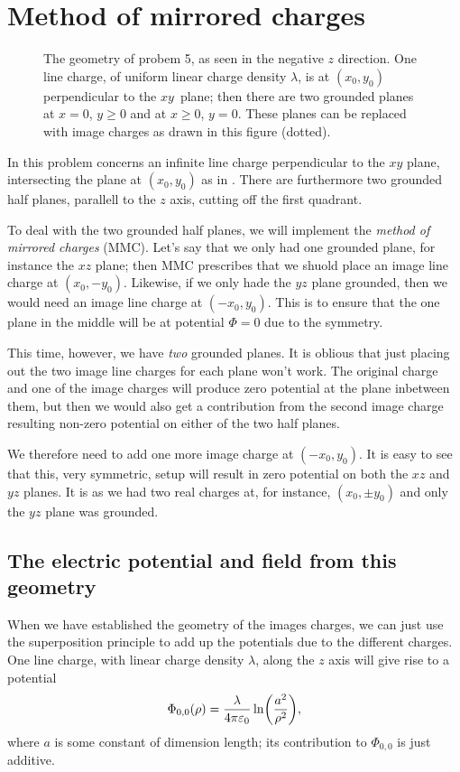 \documentclass[11pt,letter, swedish, english
]{article}
\newcommand{\enaught}{\ensuremath\varepsilon_0}
\begin{document}
\section{Method of mirrored charges}
\begin{figure}\centering

\caption{The geometry of probem 5, as seen in the negative $z$
  direction. One line charge, of uniform linear charge density
  $\lambda$, is at $(x_0, y_0)$ perpendicular to the $xy$~plane; then
  there are two grounded planes at $x=0$, $y\ge0$ and at $x\ge0$,
  $y=0$. These planes can be replaced with image charges as drawn in
  this figure (dotted). } 
\label{fig:5_geometry}
\end{figure}

In this problem concerns an infinite line charge perpendicular to the
$xy$ plane, intersecting the plane at  $(x_0, y_0)$ as in
. There are furthermore two grounded half
planes, parallell to the $z$ axis, cutting off the first quadrant. 

To deal with the two grounded half planes, we will implement the
\emph{method of mirrored charges} (MMC). Let's say that we only had one
grounded plane, for instance the $xz$ plane; then MMC prescribes that
we shuold place an image line charge at $(x_0, -y_0)$. Likewise, if we only
hade the $yz$ plane grounded, then we would need an image line charge
at $(-x_0, y_0)$. This is to ensure that the one plane in the middle
will be at potential $\Phi=0$ due to the symmetry. 

This time, however, we have \emph{two} grounded planes. It is oblious
that just placing out the two image line charges for each plane won't
work. The original charge and one of the image charges will produce
zero potential at the plane inbetween them, but then we would also get
a contribution from the second image charge resulting non-zero
potential on either of the two half planes. 

We therefore need to add one more image charge at $(-x_0, y_0)$. It is
easy to see that this, very symmetric, setup will result in zero
potential on both the $xz$ and $yz$ planes. It is as we had two real
charges at, for instance, $(x_0, \pm{y_0})$ and only the $yz$ plane
was grounded. 


\subsection{The electric potential and field from this geometry}
When we have established the geometry of the images charges, we can
just use the superposition principle to add up the potentials due to
the different charges. One line charge, with linear charge density
$\lambda$, along the $z$ axis will give rise to a potential
\begin{equation}
\Phi_{0,0}(\rho)=\frac{\lambda}{4\pi\enaught}\ln(\frac{a^2}{\rho^2}),
\end{equation}
where $a$ is some constant of dimension length; its contribution
to $\Phi_{0,0}$ is just additive.
\end{document}
